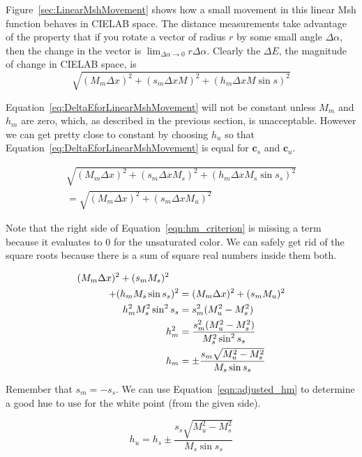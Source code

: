 \documentclass[review,journal]{vgtc}         %
\newcommand{\Lab}{CIELAB\xspace}
\newcommand{\Msh}{Msh\xspace}
\newcommand{\DeltaE}{\ensuremath{\Delta{}E}\xspace}
\newcommand*{\cvec}[1]{\mathbf{#1}}
\begin{document}
Figure~\ref{sec:LinearMshMovement} shows how a small movement in this
linear \Msh function behaves in \Lab space.  The distance measurements take
advantage of the property that if you rotate a vector of radius $r$ by some
small angle $\Delta\alpha$, then the change in the vector is
$\lim_{\Delta\alpha \rightarrow 0}r \Delta\alpha$.  Clearly the \DeltaE,
the magnitude of change in \Lab space, is
\begin{equation}
  \sqrt{(M_m \Delta x)^2 + (s_m \Delta x M)^2 + (h_m \Delta x M \sin s)^2}
  \label{eq:DeltaEforLinearMshMovement}
\end{equation}

Equation~\ref{eq:DeltaEforLinearMshMovement} will not be constant unless
$M_m$ and $h_m$ are zero, which, as described in the previous section, is
unacceptable.  However we can get pretty close to constant by choosing
$h_u$ so that Equation~\ref{eq:DeltaEforLinearMshMovement} is equal for
$\cvec{c}_s$ and $\cvec{c}_u$.

\begin{multline}
  \sqrt{(M_m \Delta x)^2 + (s_m \Delta x M_s)^2 + (h_m \Delta x M_s \sin s_s)^2}
  \\ =
  \sqrt{(M_m \Delta x)^2 + (s_m \Delta x M_u)^2}
  \label{eqn:hm_criterion}
\end{multline}

Note that the right side of Equation~\ref{eqn:hm_criterion} is missing a
term because it evaluates to 0 for the unsaturated color.  We can safely
get rid of the square roots because there is a sum of square real numbers
inside them both.

\begin{align}
    (M_m \Delta x)^2 + (s_m M_s)^2 \quad & \notag \\
    + (h_m M_s \sin s_s)^2 &= (M_m \Delta x)^2 + (s_m M_u)^2 \notag \\
    h_m^2 M_s^2 \sin^2 s_s &= s_m^2 (M_u^2 - M_s^2) \notag \\
    h_m^2 &= \frac{s_m^2 (M_u^2 - M_s^2)}{M_s^2 \sin^2 s_s} \notag \\
    h_m &= \pm \frac{s_m \sqrt{M_u^2 - M_s^2}}{M_s \sin s_s}
    \label{eqn:adjusted_hm}
\end{align}

Remember that $s_m=-s_s$.  We can use Equation~\ref{eqn:adjusted_hm} to
determine a good hue to use for the white point (from the given side).

\begin{equation}
  h_u = h_s \pm \frac{s_s \sqrt{M_u^2 - M_s^2}}{M_s \sin s_s}
  \label{eqn:adjusted_hu}
\end{equation}
\end{document}
